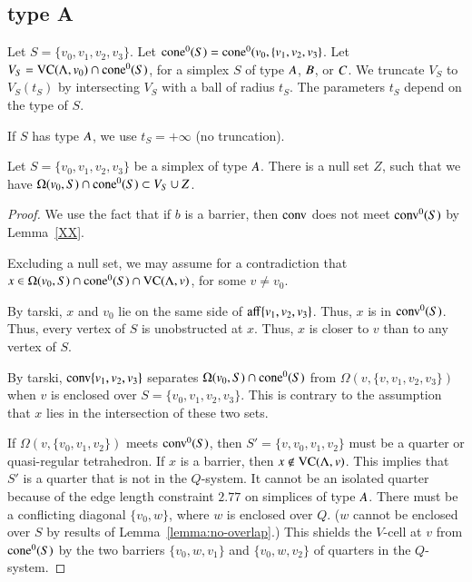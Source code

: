 \subsection{type A}%
    \label{sec:separation}

Let $S = \{v_0,v_1,v_2,v_3\}$.
Let ${\operatorname{cone}}^0(S) = {\operatorname{cone}}^0(v_0,\{v_1,v_2,v_3\}$.
Let $V_S = {\operatorname{VC}}(\Lambda,v_0)\cap {\operatorname{cone}}^0(S)$, for a simplex $S$ of type $A$,
$B$, or $C$. 
We truncate $V_S$ to $V_S(t_S)$ by intersecting
$V_S$ with a ball of radius $t_S$.  The parameters $t_S$ depend on
the type of $S$.

If $S$ has type $A$, we use $t_S=+\infty$ (no truncation).

\begin{lemma}
Let $S=\{v_0,v_1,v_2,v_3\}$ be a simplex of type $A$.
There is a null set $Z$, such that
we have  $ \Omega(v_0,S) \cap {\operatorname{cone}}^0(S) \subset V_S \cup Z$.
\end{lemma}

\begin{proof} 
We use the fact that if $b$ is a barrier, then ${\operatorname{conv}}$ does
not meet ${\operatorname{conv}}^0(S)$ by Lemma~\ref{XX}.  


Excluding a null set, we may assume 
for a contradiction that
$x\in \Omega(v_0,S) \cap {\operatorname{cone}}^0(S) \cap {\operatorname{VC}}(\Lambda,v)$,
for some $v\ne v_0$.  

By tarski, $x$ and $v_0$ lie on the
same side of ${\operatorname{aff}}\{v_1,v_2,v_3\}$.  Thus, $x$ is in
${\operatorname{conv}}^0(S)$.  
Thus, every vertex of $S$ is unobstructed at $x$.  Thus, $x$
is closer to $v$ than to any vertex of $S$.

By tarski, ${\operatorname{conv}}\{v_1,v_2,v_3\}$ 
separates
$\Omega(v_0,S)\cap {\operatorname{cone}}^0(S)$ from $\Omega(v,\{v,v_1,v_2,v_3\})$ when
$v$ is enclosed over $S=\{v_0,v_1,v_2,v_3\}$.  This is contrary
to the assumption that $x$ lies in the intersection of these
two sets.

If $\Omega(v,\{v_0,v_1,v_2\})$ meets ${\operatorname{conv}}^0(S)$, then
$S'=\{v,v_0,v_1,v_2\}$ must be a quarter or quasi-regular tetrahedron.
If $x$ is a barrier, then $x\not\in{\operatorname{VC}}(\Lambda,v)$.  This implies
that $S'$ is a quarter that is not in the $Q$-system.
It
cannot be an isolated quarter because of the edge length
constraint $2.77$ on simplices of type $A$.
There must be a
conflicting diagonal $\{v_0,w\}$, where $w$ is enclosed over $Q$. ($w$
cannot be enclosed over $S$ by results of
Lemma~\ref{lemma:no-overlap}.) This shields the $V$-cell at $v$
from ${\operatorname{cone}}^0(S)$ by the two barriers $\{v_0,w,v_1\}$ and $\{v_0,w,v_2\}$ of
quarters in the $Q$-system.
\end{proof}

